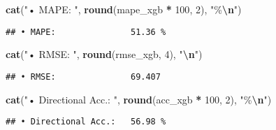 \documentclass[
]{article}
\newenvironment{Shaded}{\begin{snugshade}}{\end{snugshade}}
\newcommand{\DecValTok}[1]{\textcolor[rgb]{0.00,0.00,0.81}{#1}}
\newcommand{\FunctionTok}[1]{\textcolor[rgb]{0.13,0.29,0.53}{\textbf{#1}}}
\newcommand{\NormalTok}[1]{#1}
\newcommand{\SpecialCharTok}[1]{\textcolor[rgb]{0.81,0.36,0.00}{\textbf{#1}}}
\newcommand{\StringTok}[1]{\textcolor[rgb]{0.31,0.60,0.02}{#1}}
\begin{document}
\begin{Shaded}
\begin{Highlighting}[]
\FunctionTok{cat}\NormalTok{(}\StringTok{"• MAPE:              "}\NormalTok{, }\FunctionTok{round}\NormalTok{(mape\_xgb }\SpecialCharTok{*} \DecValTok{100}\NormalTok{, }\DecValTok{2}\NormalTok{), }\StringTok{"\%}\SpecialCharTok{\textbackslash{}n}\StringTok{"}\NormalTok{)}
\end{Highlighting}
\end{Shaded}

\begin{verbatim}
## • MAPE:               51.36 %
\end{verbatim}

\begin{Shaded}
\begin{Highlighting}[]
\FunctionTok{cat}\NormalTok{(}\StringTok{"• RMSE:              "}\NormalTok{, }\FunctionTok{round}\NormalTok{(rmse\_xgb, }\DecValTok{4}\NormalTok{), }\StringTok{"}\SpecialCharTok{\textbackslash{}n}\StringTok{"}\NormalTok{)}
\end{Highlighting}
\end{Shaded}

\begin{verbatim}
## • RMSE:               69.407
\end{verbatim}

\begin{Shaded}
\begin{Highlighting}[]
\FunctionTok{cat}\NormalTok{(}\StringTok{"• Directional Acc.:  "}\NormalTok{, }\FunctionTok{round}\NormalTok{(acc\_xgb }\SpecialCharTok{*} \DecValTok{100}\NormalTok{, }\DecValTok{2}\NormalTok{), }\StringTok{"\%}\SpecialCharTok{\textbackslash{}n}\StringTok{"}\NormalTok{)}
\end{Highlighting}
\end{Shaded}

\begin{verbatim}
## • Directional Acc.:   56.98 %
\end{verbatim}

\begin{Shaded}
\end{Shaded}
\end{document}
